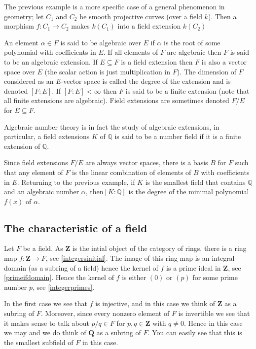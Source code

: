 \begin{example} The previous example is a more specific case of a general
phenomenon in geometry; let $C_1$ and $C_2$ be smooth projective curves (over a
field $k$). Then a morphism $f:C_1\rightarrow C_2$ makes $k(C_1)$ into a field
extension $k(C_2)$ 
\end{example}

\begin{definition}An element $\alpha\in F$ is said to be algebraic over $E$ if
$\alpha$ is the root of some polynomial with coefficients in $E$. If all
elements of $F$ are algebraic then $F$ is said to be an algebraic extension. If
$E\subseteq F$ is a field extension then $F$ is also a vector space over $E$
(the scalar action is just multiplication in $F$). The dimension of $F$
considered as an $E$-vector space is called the degree of the extension and is
denoted $[F:E]$. If $[F:E]<\infty$ then $F$ is said to be a finite extension
(note that all finite extensions are algebraic). Field extensions are sometimes
denoted $F/E$ for $E\subseteq F$.
\end{definition}

Algebraic number theory is in fact the study of algebraic extensions, in
particular, a field extensions $K$ of $\mathbb{Q}$ is said to be a number field
if it is a finite extension of $\mathbb{Q}$.

Since field extensions $F/E$ are always vector spaces, there is a basis $B$ for
$F$ such that any element of $F$ is the linear combination of elements of $B$
with coefficients in $E$. Returning to the previous example, if $K$ is the
smallest field that contains $\mathbb{Q}$ and an algebraic number $\alpha$,
then$[K:\mathbb{Q}]$ is the degree of the minimal polynomial $f(x)$ of $\alpha$.


\subsection{The characteristic of a field}
\label{more-fields}

\noindent
Let $F$ be a field. As $\mathbf{Z}$ is the intial object of the category of
rings, there is a ring map $f : \mathbf{Z} \to F$, see
\cref{integersinitial}.
The image of this ring map is an integral domain (as a subring of a field)
hence the kernel of $f$ is a prime ideal in $\mathbf{Z}$, see
\cref{primeifdomain}.
Hence the kernel of $f$ is either $(0)$ or $(p)$ for some prime number $p$, see
\cref{integerprimes}.

In the first case we see that $f$ is injective, and in this case
we think of $\mathbf{Z}$ as a subring of $F$. Moreover, since every
nonzero element of $F$ is invertible we see that it makes sense to
talk about $p/q \in F$ for $p, q \in \mathbf{Z}$ with $q \not = 0$.
Hence in this case we may and we do think of $\mathbf{Q}$ as a subring of $F$.
You can easily see that this is the smallest subfield of $F$ in this case.

